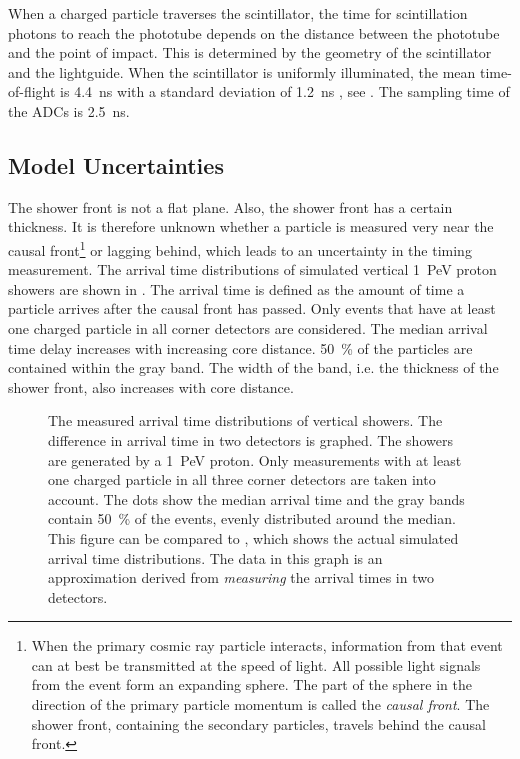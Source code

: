 When a charged particle traverses the scintillator, the time for
scintillation photons to reach the phototube depends on the distance
between the phototube and the point of impact.  This is determined by the
geometry of the scintillator and the lightguide.  When the scintillator is
uniformly illuminated, the mean time-of-flight is \SI{4.4}{\nano\second}
with a standard deviation of \SI{1.2}{\nano\second}
\cite{Steijger:2010-time}, see .  The
sampling time of the ADCs is \SI{2.5}{\nano\second}.


\subsection{Model Uncertainties}

The shower front is not a flat plane.  Also, the shower front
has a certain thickness.
It is therefore unknown whether a particle is measured very near the causal
front\footnote{When the primary cosmic ray particle interacts, information from
that event can at best be transmitted at the speed of light.  All possible light
signals from the event form an expanding sphere.  The part of the sphere in the
direction of the primary particle momentum is called the \emph{causal front}.
The shower front, containing the secondary particles, travels behind the causal
front.} or lagging behind, which leads to an uncertainty in the timing
measurement.
The arrival time distributions of simulated vertical
\SI{1}{\peta\electronvolt} proton showers are shown in
.
The arrival time is defined as the amount of time a particle arrives after the
causal front has passed.  Only events that have at least one charged particle in all
corner detectors are considered.  The median arrival time delay
increases with increasing core distance.
\SI{50}{\percent} of the particles are contained within the gray band.  The
width of the band, i.e. the thickness of the shower front, also increases with
core distance.

\begin{figure}
\centering

\caption{The measured arrival time distributions of vertical showers. The
difference in arrival time in two detectors is graphed. The showers are
generated by a \SI{1}{\peta\electronvolt} proton.  Only measurements with
at least one charged particle in all three corner detectors are taken into
account. The dots show the median arrival time and the gray bands contain
\SI{50}{\percent} of the events, evenly distributed around the median.
This figure can be compared to , which shows
the actual simulated arrival time distributions.  The data in this graph
is an approximation derived from \emph{measuring} the arrival times in two
detectors.}
\label{fig:arrival-time-distributions}
\end{figure}



